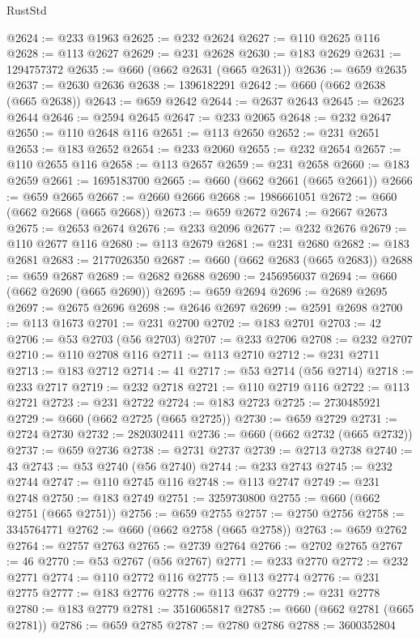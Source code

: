 \begin{lexlean}{RustStd}
\begin{coremodule}
@2624 := @233 @1963
@2625 := @232 @2624
@2627 := @110 @2625 @116
@2628 := @113 @2627
@2629 := @231 @2628
@2630 := @183 @2629
@2631 := 1294757372
@2635 := @660 (@662 @2631 (@665 @2631))
@2636 := @659 @2635
@2637 := @2630 @2636
@2638 := 1396182291
@2642 := @660 (@662 @2638 (@665 @2638))
@2643 := @659 @2642
@2644 := @2637 @2643
@2645 := @2623 @2644
@2646 := @2594 @2645
@2647 := @233 @2065
@2648 := @232 @2647
@2650 := @110 @2648 @116
@2651 := @113 @2650
@2652 := @231 @2651
@2653 := @183 @2652
@2654 := @233 @2060
@2655 := @232 @2654
@2657 := @110 @2655 @116
@2658 := @113 @2657
@2659 := @231 @2658
@2660 := @183 @2659
@2661 := 1695183700
@2665 := @660 (@662 @2661 (@665 @2661))
@2666 := @659 @2665
@2667 := @2660 @2666
@2668 := 1986661051
@2672 := @660 (@662 @2668 (@665 @2668))
@2673 := @659 @2672
@2674 := @2667 @2673
@2675 := @2653 @2674
@2676 := @233 @2096
@2677 := @232 @2676
@2679 := @110 @2677 @116
@2680 := @113 @2679
@2681 := @231 @2680
@2682 := @183 @2681
@2683 := 2177026350
@2687 := @660 (@662 @2683 (@665 @2683))
@2688 := @659 @2687
@2689 := @2682 @2688
@2690 := 2456956037
@2694 := @660 (@662 @2690 (@665 @2690))
@2695 := @659 @2694
@2696 := @2689 @2695
@2697 := @2675 @2696
@2698 := @2646 @2697
@2699 := @2591 @2698
@2700 := @113 @1673
@2701 := @231 @2700
@2702 := @183 @2701
@2703 := 42
@2706 := @53 @2703 (@56 @2703)
@2707 := @233 @2706
@2708 := @232 @2707
@2710 := @110 @2708 @116
@2711 := @113 @2710
@2712 := @231 @2711
@2713 := @183 @2712
@2714 := 41
@2717 := @53 @2714 (@56 @2714)
@2718 := @233 @2717
@2719 := @232 @2718
@2721 := @110 @2719 @116
@2722 := @113 @2721
@2723 := @231 @2722
@2724 := @183 @2723
@2725 := 2730485921
@2729 := @660 (@662 @2725 (@665 @2725))
@2730 := @659 @2729
@2731 := @2724 @2730
@2732 := 2820302411
@2736 := @660 (@662 @2732 (@665 @2732))
@2737 := @659 @2736
@2738 := @2731 @2737
@2739 := @2713 @2738
@2740 := 43
@2743 := @53 @2740 (@56 @2740)
@2744 := @233 @2743
@2745 := @232 @2744
@2747 := @110 @2745 @116
@2748 := @113 @2747
@2749 := @231 @2748
@2750 := @183 @2749
@2751 := 3259730800
@2755 := @660 (@662 @2751 (@665 @2751))
@2756 := @659 @2755
@2757 := @2750 @2756
@2758 := 3345764771
@2762 := @660 (@662 @2758 (@665 @2758))
@2763 := @659 @2762
@2764 := @2757 @2763
@2765 := @2739 @2764
@2766 := @2702 @2765
@2767 := 46
@2770 := @53 @2767 (@56 @2767)
@2771 := @233 @2770
@2772 := @232 @2771
@2774 := @110 @2772 @116
@2775 := @113 @2774
@2776 := @231 @2775
@2777 := @183 @2776
@2778 := @113 @637
@2779 := @231 @2778
@2780 := @183 @2779
@2781 := 3516065817
@2785 := @660 (@662 @2781 (@665 @2781))
@2786 := @659 @2785
@2787 := @2780 @2786
@2788 := 3600352804

\end{coremodule}
\end{lexlean}
